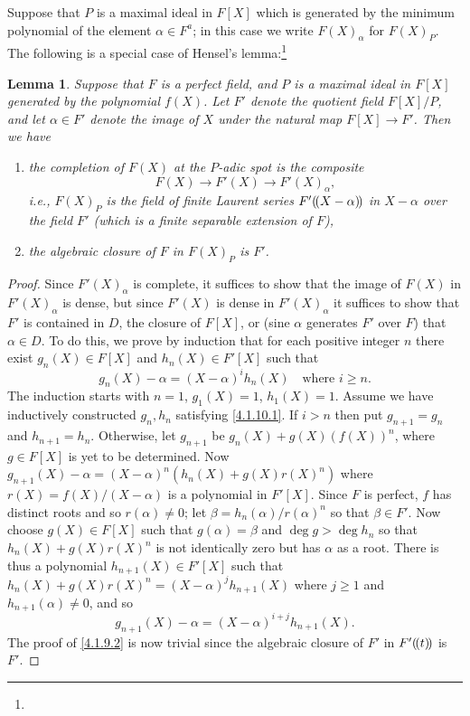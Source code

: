 \documentclass[10pt]{article}
\newtheorem{lemm}[theo]{Lemma}
\theoremstyle{definition}
\def\ldp{(\mkern-2.5mu(}
\def\rdp{)\mkern-2.5mu)}
\def\fnfoze{}
\begin{document}
Suppose that $P$ is a maximal ideal in $F[X]$ which is generated by the minimum polynomial of the element $\alpha \in F^a$; in this case we write $F(X)_\alpha$ for $F(X)_P$.
The following is a special case of Hensel's lemma:\footnote{\fnfoze}


\begin{lemm}
\label{4.1.10}
Suppose that $F$ is a perfect field, and $P$ is a maximal ideal in $F[X]$ generated by the polynomial $f(X)$.
Let $F'$ denote the quotient field $F[X]/P$, and let $\alpha \in F'$ denote the image of $X$ under the natural map $F[X] \to F'$.
Then we have
\begin{enumerate}
\item
\label{4.1.9.1}
the completion of $F(X)$ at the $P$-adic spot is the composite
\[
F(X) \to F'(X) \to F'(X)_{\alpha},
\]
i.e., $F(X)_P$ is the field of finite Laurent series $F'\ldp X-\alpha \rdp$ in $X-\alpha$ over the field $F'$ (which is a finite separable extension of $F$),

\item
\label{4.1.9.2}
the algebraic closure of $F$ in $F(X)_P$ is $F'$.
\end{enumerate}
\end{lemm}


\begin{proof}
Since $F'(X)_{\alpha}$ is complete, it suffices to show that the image of $F(X)$ in $F'(X)_\alpha$ is dense, but since $F'(X)$ is dense in $F'(X)_\alpha$ it suffices to show that $F'$ is contained in $D$, the closure of $F[X]$, or (sine $\alpha$ generates $F'$ over $F$) that $\alpha \in D$.
To do this, we prove by induction that for each positive integer $n$ there exist $g_n(X) \in F[X]$ and $h_n(X) \in F'[X]$ such that
\begin{equation}
\label{4.1.10.1}
g_n(X) - \alpha = (X-\alpha)^i h_n(X)
\quad
\text{where $i \geq n$.}
\end{equation}
The induction starts with $n=1$, $g_1(X) = 1$, $h_1(X) = 1$.
Assume we have inductively constructed $g_n, h_n$ satisfying \eqref{4.1.10.1}.
If $i > n$ then put $g_{n+1} = g_n$ and $h_{n+1} = h_n$.
Otherwise, let $g_{n+1}$ be $g_n(X) + g(X)( f(X) )^n$, where $g \in F[X]$ is yet to be determined.
Now $g_{n+1}(X) - \alpha = (X-\alpha)^n (h_n(X) + g(X) r(X)^n)$ where $r(X) = f(X) / (X - \alpha)$ is a polynomial in $F'[X]$.
Since $F$ is perfect, $f$ has distinct roots and so $r(\alpha) \not= 0$; let $\beta = h_n(\alpha) / r(\alpha)^n$ so that $\beta \in F'$.
Now choose $g(X) \in F[X]$ such that $g(\alpha) = \beta$ and $\deg g > \deg h_n$ so that $h_n(X) + g(X) r(X)^n$ is not identically zero but has $\alpha$ as a root.
There is thus a polynomial $h_{n+1}(X) \in F'[X]$ such that $h_n(X) + g(X) r(X)^n = (X-\alpha)^j h_{n+1}(X)$ where $j \geq 1$ and $h_{n+1}(\alpha) \not= 0$, and so
\[
g_{n+1}(X) - \alpha = (X - \alpha)^{i+j} h_{n+1}(X).
\]
The proof of \ref{4.1.9.2} is now trivial since the algebraic closure of $F'$ in $F'\ldp t \rdp$ is $F'$.
\end{proof}
\end{document}
